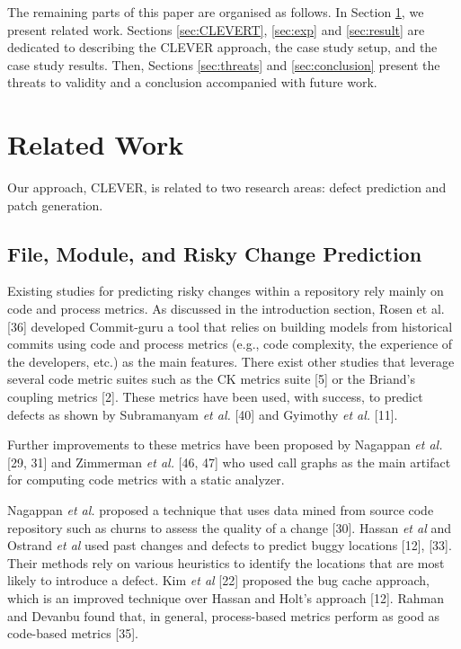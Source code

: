 \documentclass[sigconf]{acmart}
\begin{document}
The remaining parts of this paper are organised as follows. In Section
\ref{sec:relwork}, we present related work. Sections \ref{sec:CLEVERT},
\ref{sec:exp} and \ref{sec:result} are dedicated to describing the
CLEVER approach, the case study setup, and the case study results. Then,
Sections \ref{sec:threats} and \ref{sec:conclusion} present the threats
to validity and a conclusion accompanied with future work.

\section{Related Work}\label{sec:relwork}

Our approach, CLEVER, is related to two research areas: defect
prediction and patch generation.

\subsection{File, Module, and Risky Change
Prediction}\label{file-module-and-risky-change-prediction}

Existing studies for predicting risky changes within a repository rely
mainly on code and process metrics. As discussed in the introduction
section, Rosen et al. [36] developed Commit-guru a tool that relies
on building models from historical commits using code and process
metrics (e.g., code complexity, the experience of the developers, etc.)
as the main features. There exist other studies that leverage several
code metric suites such as the CK metrics suite [5] or the Briand's
coupling metrics [2]. These metrics have been used, with success, to
predict defects as shown by Subramanyam \emph{et al.} [40] and
Gyimothy \emph{et al.} [11].

Further improvements to these metrics have been proposed by Nagappan
\emph{et al.} [29, 31] and Zimmerman \emph{et al.} [46, 47] who
used call graphs as the main artifact for computing code metrics with a
static analyzer.

Nagappan \emph{et al.} proposed a technique that uses data mined from
source code repository such as churns to assess the quality of a change
[30]. Hassan \emph{et al} and Ostrand \emph{et al} used past changes
and defects to predict buggy locations [12], [33]. Their methods
rely on various heuristics to identify the locations that are most
likely to introduce a defect. Kim \emph{et al} [22] proposed the bug
cache approach, which is an improved technique over Hassan and Holt's
approach [12]. Rahman and Devanbu found that, in general,
process-based metrics perform as good as code-based metrics [35].
\end{document}
